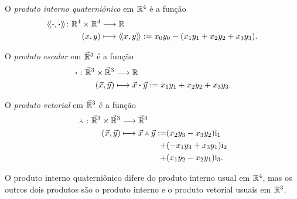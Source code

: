 \begin{definition}
O \emph{produto interno quaterniônico} em $\mathbb{R}^4$ é a função
	\begin{align*}
	{\left\langle\!\left\langle{\bm{\cdot}},{\bm{\cdot}}\right\rangle\!\right\rangle}\colon {\mathbb{R}^4 \times \mathbb{R}^4} &\longrightarrow {\mathbb{R}} \\{(x,y)} &\longmapsto \left\langle\!\left\langle{x},{y}\right\rangle\!\right\rangle := x_0y_0 - (x_1y_1 + x_2y_2 + x_3y_3).
	\end{align*}

	O \emph{produto escalar} em $\vec{\mathbb{R}}^3$ é a função
	\begin{align*}
	{{} \bm{\cdot} {}}\colon {\vec{\mathbb{R}}^3 \times \vec{\mathbb{R}}^3} &\longrightarrow {\mathbb{R}} \\{(\vec{x},\vec{y})} &\longmapsto {\vec{x}} \bm{\cdot} {\vec{y}} := x_1y_1 + x_2y_2 + x_3y_3.
	\end{align*}

O \emph{produto vetorial} em $\vec{\mathbb{R}}^3$ é a função
	\begin{align*}
	\func{\pvec{}{}}{\vec{\R}^3 \times \vec{\R}^3}{\vec{\R}^3}{(\vec{x},\vec{y})}{
		\begin{aligned}[t]
			\pvec{\vec{x}}{\vec{y}} := &(x_2y_3-x_3y_2) \ii_1 \\
			+ &(-x_1y_3+x_3y_1) \ii_2 \\
			+ &(x_1y_2-x_2y_1) \ii_3.
		\end{aligned}
	}
	\end{align*}
\end{definition}

O produto interno quaterniônico difere do produto interno usual em $\mathbb{R}^4$, mas os outros dois produtos são o produto interno e o produto vetorial usuais em $\mathbb{R}^3$.

